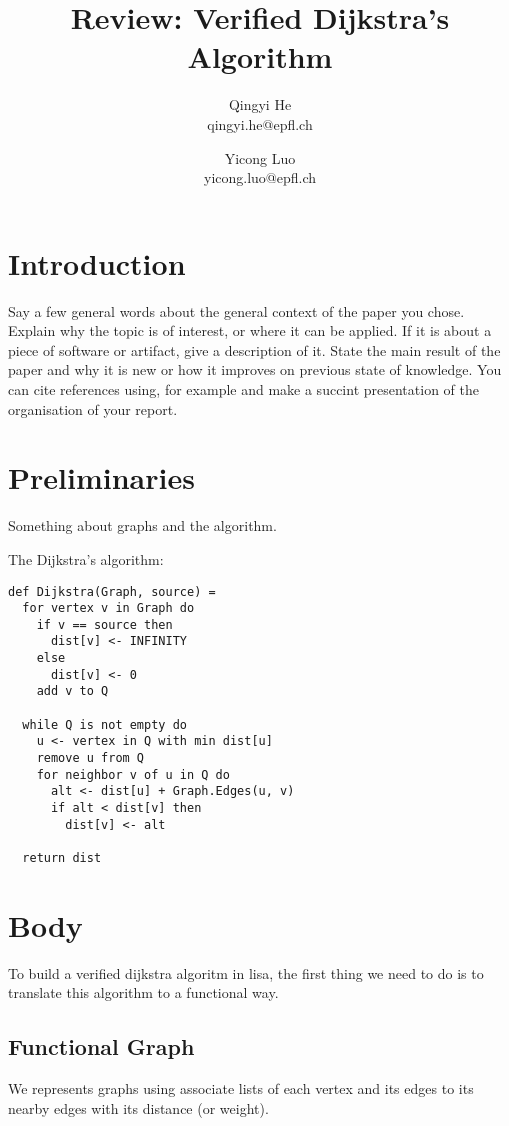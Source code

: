 \documentclass[11pt,a4paper]{article}
\title{Review: Verified Dijkstra's Algorithm}
\author{Qingyi He \\ qingyi.he@epfl.ch \and Yicong Luo\\yicong.luo@epfl.ch}
\begin{document}
\maketitle

\section{Introduction}
Say a few general words about the general context of the paper you chose. Explain why the topic is of interest, or where it can be applied. If it is about a piece of software or artifact, give a description of it. State the main result of the paper and why it is new or how it improves on previous state of knowledge. You can cite references using, for example \cite{BibliographyManagementLaTeX} and make a succint presentation of the organisation of your report.

\section{Preliminaries}

Something about graphs and the algorithm.

The Dijkstra's algorithm:

\begin{lstlisting}
def Dijkstra(Graph, source) =
  for vertex v in Graph do
    if v == source then 
      dist[v] <- INFINITY
    else
      dist[v] <- 0
    add v to Q

  while Q is not empty do
    u <- vertex in Q with min dist[u]
    remove u from Q
    for neighbor v of u in Q do
      alt <- dist[u] + Graph.Edges(u, v)
      if alt < dist[v] then
        dist[v] <- alt

  return dist
\end{lstlisting}

\section{Body}

To build a verified dijkstra algoritm in lisa, the first thing we need to do
is to translate this algorithm to a functional way.

\subsection{Functional Graph}

We represents graphs using associate lists of each vertex and 
its edges to its nearby edges with its distance (or weight).
\end{document}
